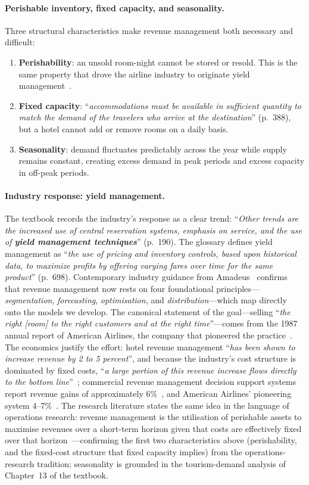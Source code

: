 \paragraph{Perishable inventory, fixed capacity, and seasonality.}
Three structural characteristics make revenue management both necessary and difficult:
\begin{enumerate}
  \item \textbf{Perishability}: an unsold room-night cannot be stored or resold. This is the same property that drove the airline industry to originate yield management~\cite{rothstein1971,talluri2004}.
  \item \textbf{Fixed capacity}: ``\emph{accommodations must be available in sufficient quantity to match the demand of the travelers who arrive at the destination}'' (p.~388), but a hotel cannot add or remove rooms on a daily basis.
  \item \textbf{Seasonality}: demand fluctuates predictably across the year while supply remains constant, creating excess demand in peak periods and excess capacity in off-peak periods.
\end{enumerate}

\paragraph{Industry response: yield management.}
The textbook records the industry's response as a clear trend: ``\emph{Other trends are the increased use of central reservation systems, emphasis on service, and the use of \textbf{yield management techniques}}'' (p.~190). The glossary defines yield management as ``\emph{the use of pricing and inventory controls, based upon historical data, to maximize profits by offering varying fares over time for the same product}'' (p.~698). Contemporary industry guidance from Amadeus~\cite{amadeus2023} confirms that revenue management now rests on four foundational principles---\emph{segmentation}, \emph{forecasting}, \emph{optimisation}, and \emph{distribution}---which map directly onto the models we develop.
The canonical statement of the goal---selling ``\emph{the right [room] to the right customers and at the right time}''---comes from the 1987 annual report of American Airlines, the company that pioneered the practice~\cite{anderson2012,smith1992}.
The economics justify the effort: hotel revenue management ``\emph{has been shown to increase revenue by 2 to 5 percent}'', and because the industry's cost structure is dominated by fixed costs, ``\emph{a large portion of this revenue increase flows directly to the bottom line}''~\cite{anderson2012}; commercial revenue management decision support systems report revenue gains of approximately 6\%~\cite{boyd2003}, and American Airlines' pioneering system 4--7\%~\cite{smith1992}.
The research literature states the same idea in the language of operations research: revenue management is the utilisation of perishable assets to maximise revenues over a short-term horizon given that costs are effectively fixed over that horizon~\cite{mcgill1999}---confirming the first two characteristics above (perishability, and the fixed-cost structure that fixed capacity implies) from the operations-research tradition; seasonality is grounded in the tourism-demand analysis of Chapter~13 of the textbook.

